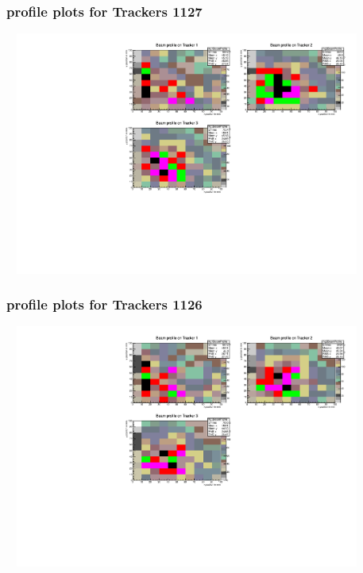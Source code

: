 \documentclass[slidestop,compress,mathserif]{beamer}
\begin{document}
\begin{frame}\frametitle{profile plots for Trackers 1127}
	 \includegraphics[width=12cm,height=8cm]{profile_plots_for_Trackers_1127.pdf}
\end{frame}
\begin{frame}\frametitle{profile plots for Trackers 1126}
	 \includegraphics[width=12cm,height=8cm]{profile_plots_for_Trackers_1126.pdf}
\end{frame}
\end{document}
